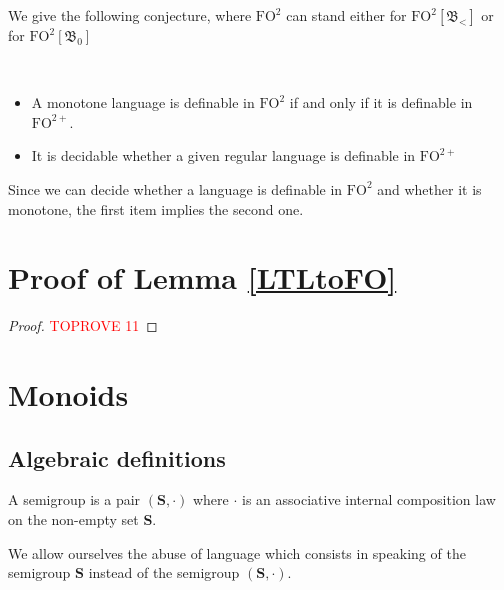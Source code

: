 \documentclass[a4paper,UKenglish,cleveref, autoref, thm-restate]{lipics-v2021}
\newcommand{\op}{\cdot}
\newcommand{\FO}{\mathrm{FO}}
\newcommand{\FOtw}{\FO^2}
\newcommand{\FOtwp}{\FO^{2+}}
\newcommand{\bin}{\mathfrak{B}}
\begin{document}
We give the following conjecture, where $\FOtw$ can stand either for $\FOtw[\bin_<]$ or for $\FOtw[\bin_0]$





\begin{conjecture} \label{conj}~
\begin{itemize}
    \item A monotone language is definable in $\FOtw$ if and only if it is definable in $\FOtwp$.
    \item It is decidable whether a given regular language is definable in $\FOtwp$
\end{itemize}

\end{conjecture}

Since we can decide whether a language is definable in $\FOtw$ and whether it is monotone, the first item implies the second one.












\appendix




\section{Proof of Lemma \ref{LTLtoFO}}\label{app:LTLtoFO}


\begin{proof}\textcolor{red}{TOPROVE 11}\end{proof}




\section{Monoids}


\subsection{Algebraic definitions} \label{ap:defmon}


\begin{definition}
    A semigroup is a pair $(\mathbf{S}, \op)$ where $\op$ is an associative internal composition law on the non-empty set $\mathbf{S}$.
\end{definition}

\begin{remark}
    We allow ourselves the abuse of language which consists in speaking of the semigroup $\mathbf{S}$ instead of the semigroup $(\mathbf{S}, \op)$.
\end{remark}
\end{document}
